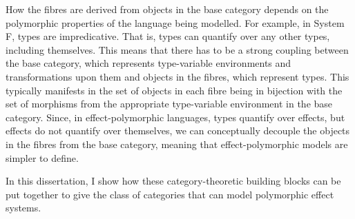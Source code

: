 How the fibres are derived from objects in the base category depends on the polymorphic properties of the language being modelled. For example, in System F, types are impredicative. That is, types can quantify over any other types, including themselves. This means that there has to be a strong coupling between the base category, which represents type-variable environments and transformations upon them and objects in the fibres, which represent types. This typically manifests in the set of objects  in each fibre being in bijection with the set of morphisms from the appropriate type-variable environment in the base category. Since, in effect-polymorphic languages, types quantify over effects, but effects do not quantify over themselves, we can conceptually decouple the objects in the fibres from the base category, meaning that effect-polymorphic models are simpler to define. 

In this dissertation, I show how these category-theoretic building blocks can be put together to give the class of categories that can model polymorphic effect systems.

